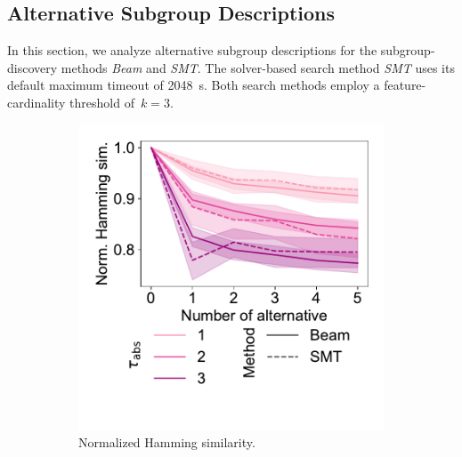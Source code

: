 \documentclass{article}
\theoremstyle{definition}
\begin{document}
\subsection{Alternative Subgroup Descriptions}
\label{sec:csd:evaluation:alternatives}

In this section, we analyze alternative subgroup descriptions for the subgroup-discovery methods \emph{Beam} and \emph{SMT}.
The solver-based search method \emph{SMT} uses its default maximum timeout of 2048~s.
Both search methods employ a feature-cardinality threshold of~$k=3$.


\begin{figure}[t]
	\centering
	\begin{subfigure}[t]{0.48\textwidth}
		\centering
		\includegraphics[width=\textwidth, trim=20 50 15 15, clip]{plots/csd-alternatives-hamming.pdf}
		\caption{Normalized Hamming similarity.}
		\label{fig:csd:alternatives-hamming}
	\end{subfigure}
	\hfill
	\begin{subfigure}[t]{0.48\textwidth}
		\centering

\end{subfigure}
\end{figure}
\end{document}

